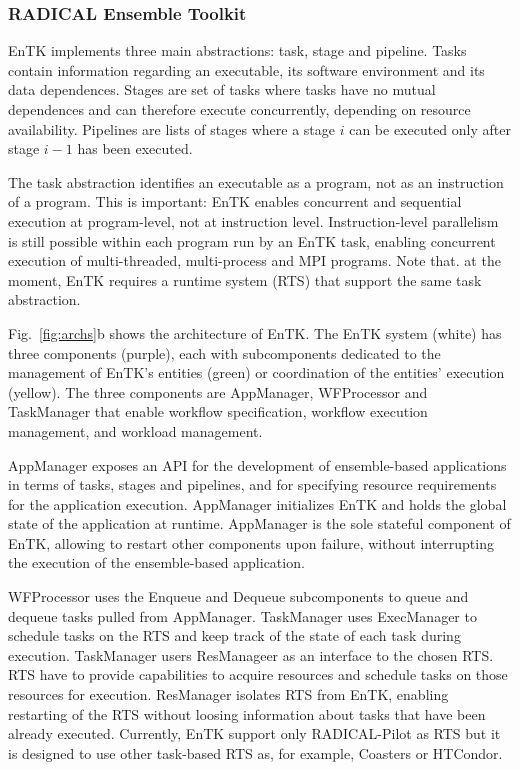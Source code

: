 \documentclass[preprint,12pt, a4paper]{elsarticle}
\begin{document}

\subsubsection{RADICAL Ensemble Toolkit}\label{sssec:arch_entk}

EnTK implements three main abstractions: task, stage and pipeline. Tasks
contain information regarding an executable, its software environment and its
data dependences. Stages are set of tasks where tasks have no mutual
dependences and can therefore execute concurrently, depending on resource
availability. Pipelines are lists of stages where a stage \(i\) can be
executed only after stage \(i-1\) has been executed.

The task abstraction identifies an executable as a program, not as an
instruction of a program. This is important: EnTK enables concurrent and
sequential execution at program-level, not at instruction level.
Instruction-level parallelism is still possible within each program run by an
EnTK task, enabling concurrent execution of multi-threaded, multi-process and
MPI programs. Note that. at the moment, EnTK requires a runtime system (RTS)
that support the same task abstraction.

Fig.~\ref{fig:archs}b shows the architecture of EnTK. The EnTK system (white)
has three components (purple), each with subcomponents dedicated to the
management of EnTK's entities (green) or coordination of the entities'
execution (yellow). The three components are AppManager, WFProcessor and
TaskManager that enable workflow specification, workflow execution
management, and workload management.

AppManager exposes an API for the development of ensemble-based applications
in terms of tasks, stages and pipelines, and for specifying resource
requirements for the application execution. AppManager initializes EnTK and
holds the global state of the application at runtime. AppManager is the sole
stateful component of EnTK, allowing to restart other components upon
failure, without interrupting the execution of the ensemble-based
application.

WFProcessor uses the Enqueue and Dequeue subcomponents to queue and dequeue
tasks pulled from AppManager. TaskManager uses ExecManager to schedule tasks
on the RTS and keep track of the state of each task during execution.
TaskManager users ResManageer as an interface to the chosen RTS. RTS have to
provide capabilities to acquire resources and schedule tasks on those
resources for execution. ResManager isolates RTS from EnTK, enabling
restarting of the RTS without loosing information about tasks that have been
already executed. Currently, EnTK support only RADICAL-Pilot as RTS but it is
designed to use other task-based RTS as, for example, Coasters or HTCondor.
\end{document}
